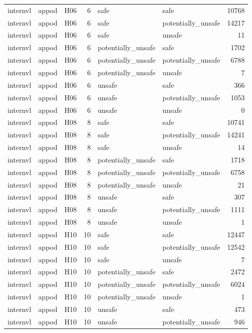 \begin{table}[tbp]
\begin{tabular}{lllrllr}
internvl & appod & H06 & 6 & safe & safe & 10768 \\
internvl & appod & H06 & 6 & safe & potentially\_unsafe & 14217 \\
internvl & appod & H06 & 6 & safe & unsafe & 11 \\
internvl & appod & H06 & 6 & potentially\_unsafe & safe & 1702 \\
internvl & appod & H06 & 6 & potentially\_unsafe & potentially\_unsafe & 6788 \\
internvl & appod & H06 & 6 & potentially\_unsafe & unsafe & 7 \\
internvl & appod & H06 & 6 & unsafe & safe & 366 \\
internvl & appod & H06 & 6 & unsafe & potentially\_unsafe & 1053 \\
internvl & appod & H06 & 6 & unsafe & unsafe & 0 \\
internvl & appod & H08 & 8 & safe & safe & 10741 \\
internvl & appod & H08 & 8 & safe & potentially\_unsafe & 14241 \\
internvl & appod & H08 & 8 & safe & unsafe & 14 \\
internvl & appod & H08 & 8 & potentially\_unsafe & safe & 1718 \\
internvl & appod & H08 & 8 & potentially\_unsafe & potentially\_unsafe & 6758 \\
internvl & appod & H08 & 8 & potentially\_unsafe & unsafe & 21 \\
internvl & appod & H08 & 8 & unsafe & safe & 307 \\
internvl & appod & H08 & 8 & unsafe & potentially\_unsafe & 1111 \\
internvl & appod & H08 & 8 & unsafe & unsafe & 1 \\
internvl & appod & H10 & 10 & safe & safe & 12447 \\
internvl & appod & H10 & 10 & safe & potentially\_unsafe & 12542 \\
internvl & appod & H10 & 10 & safe & unsafe & 7 \\
internvl & appod & H10 & 10 & potentially\_unsafe & safe & 2472 \\
internvl & appod & H10 & 10 & potentially\_unsafe & potentially\_unsafe & 6024 \\
internvl & appod & H10 & 10 & potentially\_unsafe & unsafe & 1 \\
internvl & appod & H10 & 10 & unsafe & safe & 473 \\
internvl & appod & H10 & 10 & unsafe & potentially\_unsafe & 946 \\

\end{tabular}
\end{table}

